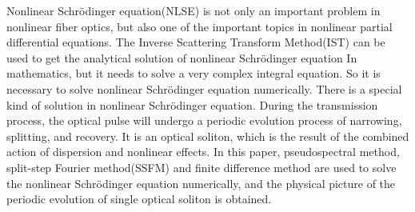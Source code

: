 \begin{abstracten}
    Nonlinear Schr\"odinger equation(NLSE) is not only an important problem in nonlinear fiber optics, but also one of the important topics in nonlinear partial differential equations. The Inverse Scattering Transform Method(IST) can be used to get the analytical solution of nonlinear Schr\"odinger equation In mathematics, but it needs to solve a very complex integral equation. So it is necessary to solve nonlinear Schr\"odinger equation numerically. There is a special kind of solution in nonlinear Schr\"odinger equation. During the transmission process, the optical pulse will undergo a periodic evolution process of narrowing, splitting, and recovery. It is an optical soliton, which is the result of the combined action of dispersion and nonlinear effects. In this paper, pseudospectral method, split-step Fourier method(SSFM) and finite difference method are used to solve the nonlinear Schr\"odinger equation numerically, and the physical picture of the periodic evolution of single optical soliton is obtained.
\end{abstracten}